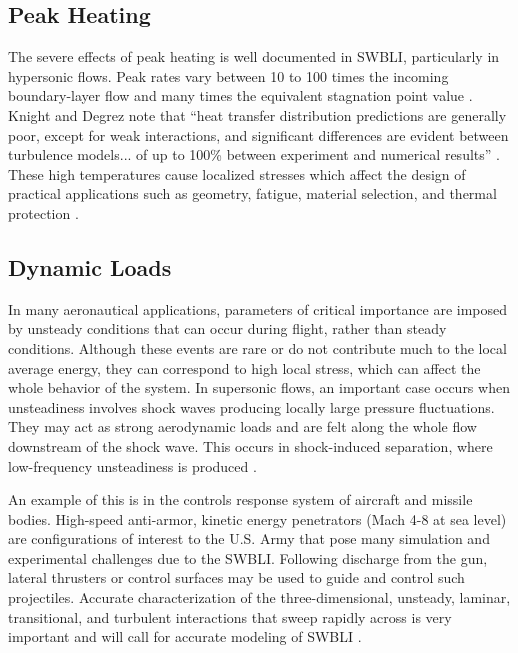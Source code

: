 \subsection{Peak Heating}
The severe effects of peak heating is well documented in SWBLI, particularly in hypersonic flows. Peak rates vary between 10 to 100 times the incoming boundary-layer flow and many times the equivalent stagnation point value \cite{Dolling2001}. Knight and Degrez note that \enquote{heat transfer distribution predictions are generally poor, except for weak interactions, and significant differences are evident between turbulence models... of up to 100\% between experiment and numerical results} \cite{Knight1998}. These high temperatures cause localized stresses which affect the design of practical applications such as geometry, fatigue, material selection, and thermal protection \cite{Dolling2001}.

\subsection{Dynamic Loads}
In many aeronautical applications, parameters of critical importance are imposed by unsteady conditions that can occur during flight, rather than steady conditions. Although these events are rare or do not contribute much to the local average energy, they can correspond to high local stress, which can affect the whole behavior of the system. In supersonic flows, an important case occurs when unsteadiness involves shock waves producing locally large pressure fluctuations. They may act as strong aerodynamic loads and are felt along the whole flow downstream of the shock wave. This occurs in shock-induced separation, where low-frequency unsteadiness is produced \cite{Piponniau2009}.

An example of this is in the controls response system of aircraft and missile bodies. High-speed anti-armor, kinetic energy penetrators (Mach 4-8 at sea level) are configurations of interest to the U.S. Army that pose many simulation and experimental challenges due to the SWBLI. Following discharge from the gun, lateral thrusters or control surfaces may be used to guide and control such projectiles. Accurate characterization of the three-dimensional, unsteady, laminar, transitional, and turbulent interactions that sweep rapidly across is very important and will call for accurate modeling of SWBLI \cite{Dolling2001}. %


